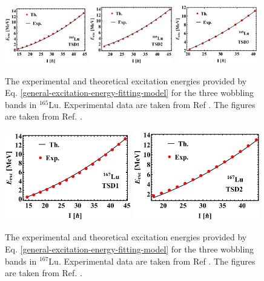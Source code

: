 \begin{figure}
    \centering
    \includegraphics[width=0.32\textwidth]{Chapters/Figures/Lu-exp-energies/fig4a_lu165.pdf}
    \includegraphics[width=0.32\textwidth]{Chapters/Figures/Lu-exp-energies/fig4b_lu165.pdf}
    \includegraphics[width=0.32\textwidth]{Chapters/Figures/Lu-exp-energies/fig4c_lu165.pdf}
    \caption{The experimental and theoretical excitation energies provided by Eq. \ref{general-excitation-energy-fitting-model} for the three wobbling bands in $^{165}$Lu. Experimental data are taken from Ref \cite{schonwasser2003one}. The figures are taken from Ref. \cite{raduta2020approach}.}
    \label{excitation-energies-th-165Lu}
\end{figure}
\begin{figure}
    \centering
    \includegraphics[width=0.49\textwidth]{Chapters/Figures/Lu-exp-energies/fig5a_lu167.pdf}
    \includegraphics[width=0.49\textwidth]{Chapters/Figures/Lu-exp-energies/fig5b_lu167.pdf}
    \caption{The experimental and theoretical excitation energies provided by Eq. \ref{general-excitation-energy-fitting-model} for the three wobbling bands in $^{167}$Lu. Experimental data are taken from Ref \cite{amro2003wobbling}. The figures are taken from Ref. \cite{raduta2020approach}.}
    \label{excitation-energies-th-167Lu}
\end{figure}

